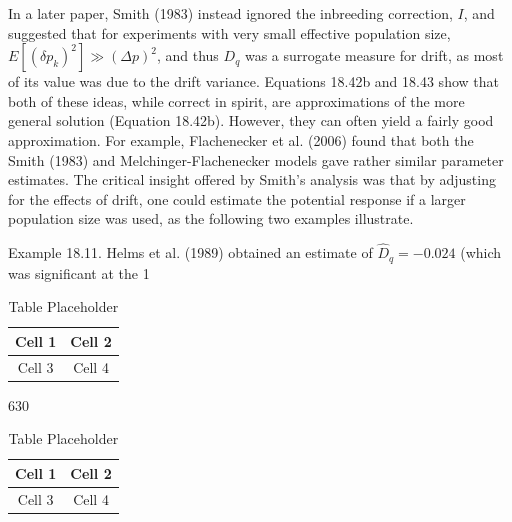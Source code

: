 \documentclass{article}
\begin{document}
In a later paper, Smith (1983) instead ignored the inbreeding correction,  $ I $, and suggested that for experiments with very small effective population size,  $ E\left[\left(\delta p_k\right)^2\right] \gg \left(\Delta p\right)^2 $, and thus  $ D_q $ was a surrogate measure for drift, as most of its value was due to the drift variance. Equations 18.42b and 18.43 show that both of these ideas, while correct in spirit, are approximations of the more general solution (Equation 18.42b). However, they can often yield a fairly good approximation. For example, Flachenecker et al. (2006) found that both the Smith (1983) and Melchinger-Flachenecker models gave rather similar parameter estimates. The critical insight offered by Smith's analysis was that by adjusting for the effects of drift, one could estimate the potential response if a larger population size was used, as the following two examples illustrate.

Example 18.11. Helms et al. (1989) obtained an estimate of  $ \widehat{D}_q = -0.024 $ (which was significant at the 1%

\begin{table}[h]
\centering
\begin{tabular}{|c|c|}
\hline
Cell 1 & Cell 2 \\
\hline
Cell 3 & Cell 4 \\
\hline
\end{tabular}
\caption{Table Placeholder}
\end{table}

630

\begin{table}[h]
\centering
\begin{tabular}{|c|c|}
\hline
Cell 1 & Cell 2 \\
\hline
Cell 3 & Cell 4 \\
\hline
\end{tabular}
\caption{Table Placeholder}
\end{table}
\end{document}
